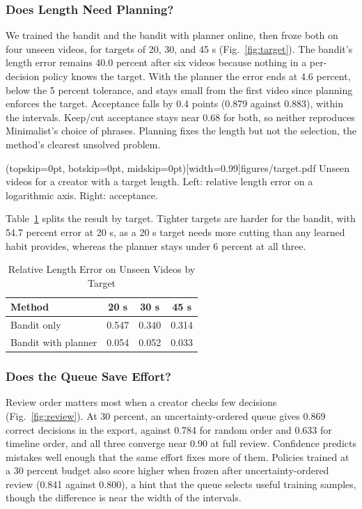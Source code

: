 \documentclass{ieeeaccess}
\begin{document}
\subsubsection{Does Length Need Planning?}
We trained the bandit and the bandit with planner online, then froze both on four unseen videos, for targets of 20, 30, and 45 s (Fig.~\ref{fig:target}). The bandit's length error remains 40.0 percent after six videos because nothing in a per-decision policy knows the target. With the planner the error ends at 4.6 percent, below the 5 percent tolerance, and stays small from the first video since planning enforces the target. Acceptance falls by 0.4 points (0.879 against 0.883), within the intervals. Keep/cut acceptance stays near 0.68 for both, so neither reproduces Minimalist's choice of phrases. Planning fixes the length but not the selection, the method's clearest unsolved problem.

\Figure[t!](topskip=0pt, botskip=0pt, midskip=0pt)[width=0.99\columnwidth]{figures/target.pdf}
{Unseen videos for a creator with a target length. Left: relative length error on a logarithmic axis. Right: acceptance.\label{fig:target}}

Table~\ref{tab:target} splits the result by target. Tighter targets are harder for the bandit, with 54.7 percent error at 20 s, as a 20 s target needs more cutting than any learned habit provides, whereas the planner stays under 6 percent at all three.

\begin{table}[t]
\caption{Relative Length Error on Unseen Videos by Target}
\label{tab:target}
\setlength{\tabcolsep}{5pt}
\centering
\begin{tabular}{|l|c|c|c|}
\hline
Method & 20 s & 30 s & 45 s \\
\hline
Bandit only & 0.547 & 0.340 & 0.314 \\
Bandit with planner & 0.054 & 0.052 & 0.033 \\
\hline
\end{tabular}
\end{table}

\subsubsection{Does the Queue Save Effort?}
Review order matters most when a creator checks few decisions (Fig.~\ref{fig:review}). At 30 percent, an uncertainty-ordered queue gives 0.869 correct decisions in the export, against 0.784 for random order and 0.633 for timeline order, and all three converge near 0.90 at full review. Confidence predicts mistakes well enough that the same effort fixes more of them. Policies trained at a 30 percent budget also score higher when frozen after uncertainty-ordered review (0.841 against 0.800), a hint that the queue selects useful training samples, though the difference is near the width of the intervals.
\end{document}
